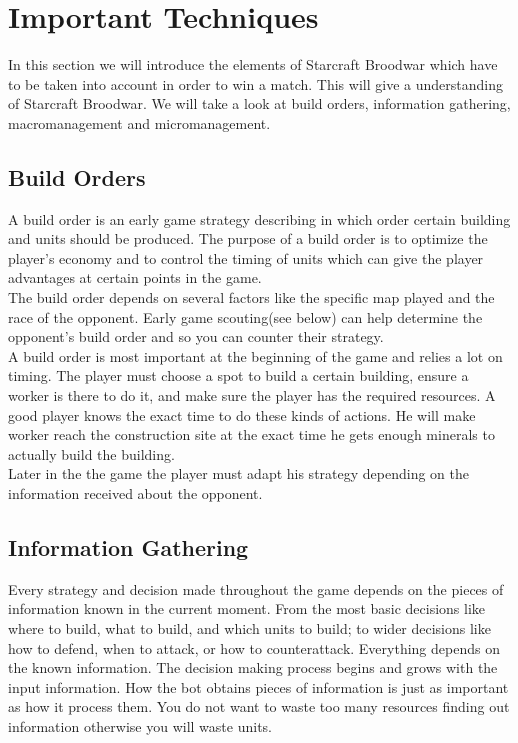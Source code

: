 \section{Important Techniques}
In this section we will introduce the elements of Starcraft Broodwar which have to be taken into account in order to win a match. This will give a understanding 
of Starcraft Broodwar. We will take a look at build orders, information gathering, macromanagement and
micromanagement.

	\subsection{Build Orders}
		A build order is an early game strategy describing in which order certain building and units should be produced\cite{wiki_build_order}. 
		The purpose of a build order is to optimize the player's economy and to control the timing of units which can give 
		the player advantages at certain points in the game.\\
		The build order depends on several factors like the specific map played and the race of the opponent. 
		Early game scouting(see below) can help determine the opponent's build order and so you can counter their strategy.\\
		
		A build order is most important at the beginning of the game and relies a lot on timing. 
		The player must choose a spot to build a certain building, ensure a worker is there to do it, 
		and make sure the player has the required resources. 
		A good player knows the exact time to do these kinds of actions. 
		He will make worker reach the construction site at the exact time he gets enough minerals to actually build the building.\\
		
		Later in the the game the player must adapt his strategy depending on the information received about the opponent.
	
	\subsection{Information Gathering}
		Every strategy and decision made throughout the game depends on the pieces of information 
		known in the current moment. From the most basic decisions like where to build, what to build, and
		which units to build; to wider decisions like how to defend, when to attack, or how to counterattack.
		Everything depends on the known information. The decision making process begins and grows with the input information.
		How the bot obtains pieces of information is just as important 
		as how it process them. You do not want to waste too many resources finding out information otherwise you will waste units. 
	
